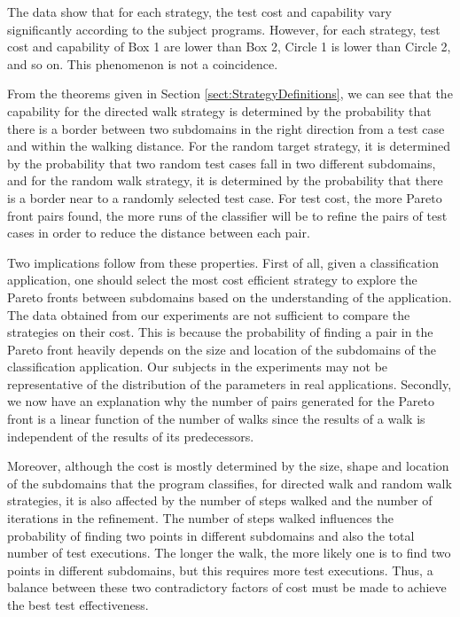 \documentclass[preprint,1p,authoryear,times]{elsarticle}
\begin{document}
The data show that for each strategy, the test cost and capability vary significantly according to the subject programs. However, for each strategy, test cost and capability of Box 1 are lower than Box 2, Circle 1 is lower than Circle 2, and so on. This phenomenon is not a coincidence.

From the theorems given in Section \ref{sect:StrategyDefinitions}, we can see that the capability for the directed walk strategy is determined by the probability that there is a border between two subdomains in the right direction from a test case and within the walking distance. For the random target strategy, it is determined by the probability that two random test cases fall in two different subdomains, and for the random walk strategy, it is determined by the probability that there is a border near to a randomly selected test case. For test cost, the more Pareto front pairs found, the more runs of the classifier will be to refine the pairs of test cases in order to reduce the distance between each pair. 

Two implications follow from these properties. First of all, given a classification application, one should select the most cost efficient strategy to explore the Pareto fronts between subdomains based on the understanding of the application. The data obtained from our experiments are not sufficient to compare the strategies on their cost. This is because the probability of finding a pair in the Pareto front heavily depends on the size and location of the subdomains of the classification application. Our subjects in the experiments may not be representative of the distribution of the parameters in real applications. Secondly, we now have an explanation why the number of pairs generated for the Pareto front is a linear function of the number of walks since the results of a walk is independent of the results of its predecessors.

Moreover, although the cost is mostly determined by the size, shape and location of the subdomains that the program classifies, for directed walk and random walk strategies, it is also affected by the number of steps walked and the number of iterations in the refinement. The number of steps walked influences the probability of finding two points in different subdomains and also the total number of test executions. The longer the walk, the more likely one is to find two points in different subdomains, but this requires more test executions. Thus, a balance between these two contradictory factors of cost must be made to achieve the best test effectiveness. 
\end{document}

